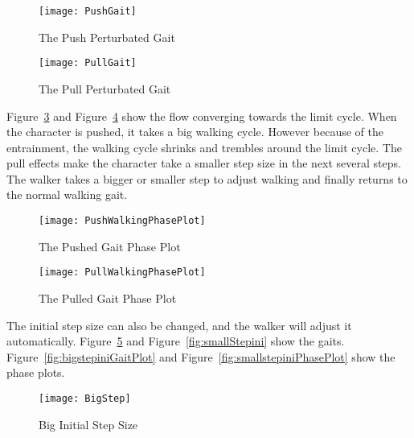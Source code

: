 \begin{figure}[!htbp]
  \begin{center}
      \texttt{[image: PushGait]}
    \caption{The Push Perturbated Gait}
    \label{fig:PushGait}
\end{center}
\end{figure}


\begin{figure}[!htbp]
  \begin{center}
      \texttt{[image: PullGait]}
    \caption{The Pull Perturbated Gait}
    \label{fig:PullGait}
\end{center}
\end{figure}

Figure~\ref{fig:PushGaitPlot} and Figure~\ref{fig:PullGaitPhasePlot} show the flow converging towards the limit cycle.
When the character is pushed, it takes a big walking cycle. 
However because of the entrainment, the walking cycle shrinks and trembles around the limit cycle. 
The pull effects make the character take a smaller step size in the next several steps.
The walker takes a bigger or smaller step to adjust walking and finally returns to the normal walking gait.


\begin{figure}[!htbp]
  \begin{center}
      \texttt{[image: PushWalkingPhasePlot]}
    \caption{The Pushed Gait Phase Plot}
    \label{fig:PushGaitPlot}
\end{center}
\end{figure}


\begin{figure}[!htbp]
  \begin{center}
      \texttt{[image: PullWalkingPhasePlot]}
    \caption{The Pulled Gait Phase Plot}
    \label{fig:PullGaitPhasePlot}
\end{center}
\end{figure}


The initial step size can also be changed, and the walker will adjust it automatically.
Figure~\ref{fig:bigStepIni} and Figure~\ref{fig:smallStepini} show the gaits.
Figure~\ref{fig:bigstepiniGaitPlot} and Figure~\ref{fig:smallstepiniPhasePlot} show the phase plots.

\begin{figure}[!htbp]
  \begin{center}
      \texttt{[image: BigStep]}
    \caption{Big Initial Step Size}
    \label{fig:bigStepIni}
\end{center}
\end{figure}


